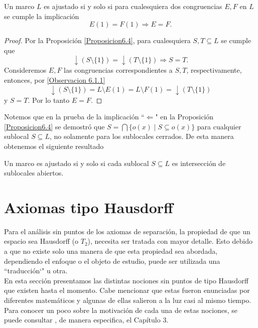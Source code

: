 \begin{thm}\label{Teorema6.5}
    Un marco $L$ es ajustado si y solo si para cualesquiera dos congruencias $E, F$ en $L$ se cumple la implicación
    \[
    E(1)=F(1)\Rightarrow E=F.
    \]

    \begin{proof}
        Por la Proposición \ref{Proposicion6.4}, para cualesquiera $S, T\subseteq L$ se cumple que 
        \[
        \downarrow(S\setminus \{1\})=\downarrow(T\setminus \{1\})\Rightarrow S=T.
        \]
        Consideremos $E, F$ las congruencias correspondientes a $S, T$, respectivamente, entonces, por \ref{Observacion 6.1.1}
        \[
        \downarrow (S\setminus \{1\})=L\setminus E(1)=L\setminus F(1)=\downarrow (T\setminus \{1\})
        \]
        y $S=T$. Por lo tanto $E=F$.
    \end{proof}
\end{thm}


Notemos que en la prueba de la implicación ``$\Leftarrow$" en la Proposición \ref{Proposicion6.4} se demostró que $S=\bigcap\{o(x)\mid S\subseteq o(x)\}$ para cualquier sublocal $S\subseteq L$, no solamente para los sublocales cerrados. De esta manera obtenemos el siguiente resultado

\begin{thm}
    Un marco es ajustado si y solo si cada sublocal $S\subseteq L$ es intersección de sublocales abiertos.
\end{thm}

\section{Axiomas tipo Hausdorff}

Para el análisis sin puntos de los axiomas de separación, la propiedad de que un espacio sea Hausdorff (o $T_2$), necesita ser tratada con mayor detalle. Esto debido a que no existe solo una manera de que esta propiedad sea abordada, dependiendo el enfoque o el objeto de estudio, puede ser utilizada una ``traducción`" u otra.\\

En esta sección presentamos las distintas nociones sin puntos de tipo Hausdorff que existen hasta el momento. Cabe mencionar que estas fueron enunciadas por diferentes matemáticos y algunas de ellas salieron a la luz casi al mismo tiempo. Para conocer un poco sobre la motivación de cada una de estas nociones, se puede consultar \cite{J.P.2}, de manera especifica, el Capítulo 3.\\

